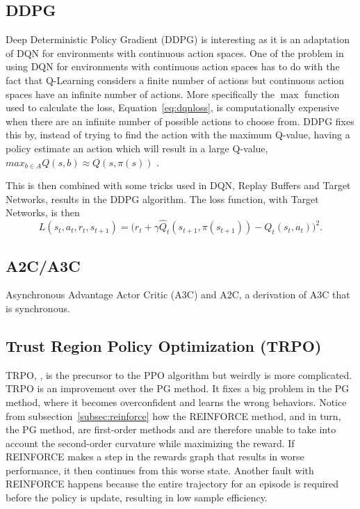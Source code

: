 \subsection{DDPG}

Deep Deterministic Policy Gradient (DDPG) is interesting as it is an adaptation of DQN for environments with continuous action spaces. One of the problem in using DQN for environments with continuous action spaces has to do with the fact that Q-Learning considers a finite number of actions but continuous action spaces have an infinite number of actions. More specifically the $\max$ function used to calculate the loss, Equation~\ref{eq:dqnloss}, is computationally expensive when there are an infinite number of possible actions to choose from. DDPG fixes this by, instead of trying to find the action with the maximum Q-value, having a policy estimate an action which will result in a large Q-value, $max_{b\in A} Q(s,b)\approx Q(s, \pi(s))$ \cite{lillicrap_hunt_pritzel_heess_erez_tassa_silver_wierstra_2015}.

This is then combined with some tricks used in DQN, Replay Buffers and Target Networks, results in the DDPG algorithm. The loss function, with Target Networks, is then $$L(s_t, a_t, r_t, s_{t+1})=\big(r_t+\gamma \hat{Q}_t(s_{t+1},\pi(s_{t+1}))-Q_t(s_t,a_t)\big)^2.$$

\subsection{A2C/A3C}

Asynchronous Advantage Actor Critic (A3C) and A2C, a derivation of A3C that is synchronous.

\subsection{Trust Region Policy Optimization (TRPO)}

TRPO, \cite{schulman_levine_mortiz_jordan_abbeel_2015}, is the precursor to the PPO algorithm but weirdly is more complicated. TRPO is an improvement over the PG method. It fixes a big problem in the PG method, where it becomes overconfident and learns the wrong behaviors. Notice from subsection~\ref{subsec:reinforce} how the REINFORCE method, and in turn, the PG method, are first-order methods and are therefore unable to take into account the second-order curvature while maximizing the reward. If REINFORCE makes a step in the rewards graph that results in worse performance, it then continues from this worse state. Another fault with REINFORCE happens because the entire trajectory for an episode is required before the policy is update, resulting in low sample efficiency. 

